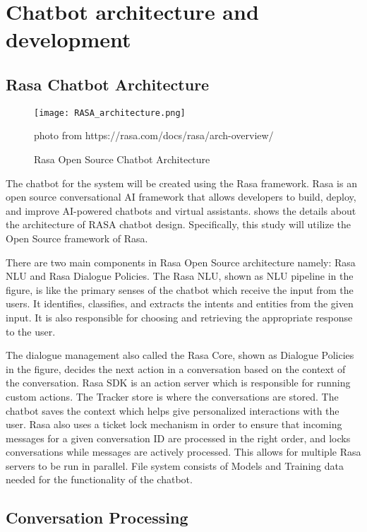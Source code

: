 \section{Chatbot architecture and development}

\subsection{Rasa Chatbot Architecture}

\begin{figure}[h]
	\centering 
	\texttt{[image: RASA\_architecture.png]}
	\caption{Rasa Open Source Chatbot Architecture}
	photo from https://rasa.com/docs/rasa/arch-overview/
	\label{fig:rasa_architecture}
\end{figure}

The chatbot for the system will be created using the Rasa framework. Rasa is an open source conversational AI framework that allows developers to build, deploy, and improve AI-powered chatbots and virtual assistants.  shows the details about the architecture of RASA chatbot design. Specifically, this study will utilize the Open Source framework of Rasa.

There are two main components in Rasa Open Source architecture namely: Rasa NLU and Rasa Dialogue Policies. The Rasa NLU, shown as NLU pipeline in the figure, is like the primary senses of the chatbot which receive the input from the users. It identifies, classifies, and extracts the intents and entities from the given input. It is also responsible for choosing and retrieving the appropriate response to the user. 

The dialogue management also called the Rasa Core, shown as Dialogue Policies in the figure, decides the next action in a conversation based on the context of the conversation. Rasa SDK is an action server which is responsible for running custom actions. The Tracker store is where the conversations are stored. The chatbot saves the context which helps give personalized interactions with the user. Rasa also uses a ticket lock mechanism in order to ensure that incoming messages for a given conversation ID are processed in the right order, and locks conversations while messages are actively processed. This allows for multiple Rasa servers to be run in parallel. File system consists of Models and Training data needed for the functionality of the chatbot.

\subsection {Conversation Processing}

